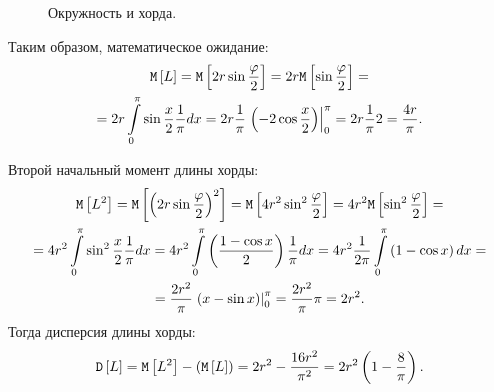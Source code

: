 \begin{figure}
    \centering
    \caption{Окружность и хорда.}
    \label{10:450:hord}
\end{figure}

Таким образом, математическое ожидание:
\begin{multline}
    \mathtt{M} \left [ L \right ]
    = \mathtt{M} \left [ 2 r \sin \frac{\varphi}{2} \right ]
    = 2 r \mathtt{M} \left [ \sin \frac{\varphi}{2} \right ] = \\
    = 2 r \int \limits_0^\pi \sin \frac{x}{2} \frac{1}{\pi} d x
    = 2 r \frac{1}{\pi} \left . \left ( - 2 \cos \frac{x}{2} \right ) \right |_0^\pi
    = 2 r \frac{1}{\pi} 2
    = \frac{4 r}{\pi} .
\end{multline}

Второй начальный момент длины хорды:
\begin{multline}
    \mathtt{M} \left [ L^2 \right ]
    = \mathtt{M} \left [ \left ( 2 r \sin \frac{\varphi}{2} \right )^2 \right ]
    = \mathtt{M} \left [ 4 r^2 \sin^2 \frac{\varphi}{2} \right ]
    = 4 r^2 \mathtt{M} \left [ \sin^2 \frac{\varphi}{2} \right ] = \\
    = 4 r^2 \int \limits_0^\pi \sin^2 \frac{x}{2} \frac{1}{\pi} d x
    = 4 r^2 \int \limits_0^\pi \left ( \frac{1 - \cos x}{2} \right ) \frac{1}{\pi} d x
    = 4 r^2 \frac{1}{2 \pi} \int \limits_0^\pi \left ( 1 - \cos x \right ) d x = \\
    = \frac{2 r^2}{\pi} \left . \left ( x - \sin x \right ) \right |_0^\pi
    = \frac{2 r^2}{\pi} \pi
    = 2 r^2 .
\end{multline}
Тогда дисперсия длины хорды:
\begin{equation}
    \mathtt{D} \left [ L \right ]
    = \mathtt{M} \left [ L^2 \right ] - \left ( \mathtt{M} \left [ L \right ] \right )
    = 2 r^2 - \frac{16 r^2}{\pi^2}
    = 2 r^2 \left ( 1 - \frac{8}{\pi} \right ).
\end{equation}

